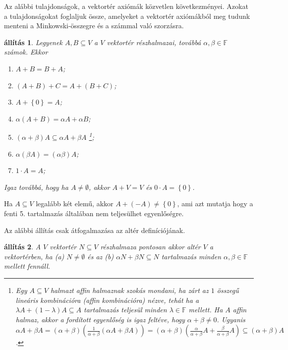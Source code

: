 \documentclass[a4paper, showtrims]{memoir}
\theoremstyle{plain}
\newtheorem{proposition}{állítás}[chapter]
\theoremstyle{remark}
\theoremstyle{definition}
\begin{document}
Az alábbi tulajdonságok, a vektortér axiómák közvetlen következményei.
Azokat a tulajdonságokat foglaljuk össze, amelyeket a vektortér axiómákból meg tudunk menteni
a Minkowski-összegre és a számmal való szorzásra.
\begin{proposition}\label{pr:Minkowski}
	Legyenek $A,B\subseteq V$ a $V$ vektortér részhalmazai,
	továbbá $\alpha,\beta\in\mathbb{F}$ számok.
	Ekkor
	\begin{enumerate}
		\item $A+B=B+A$;
		\item $\left( A+B \right)+C=A+\left( B+C \right)$;
		\item $A+\left\{ 0 \right\}=A$;
		\item $\alpha\left( A+B \right)=\alpha A+\alpha B$;
		\item $\left( \alpha+\beta \right) A\subseteq \alpha A+\beta A$%
		      \footnote{
			      Egy $A\subseteq V$ halmazt \emph{affin halmaznak}
			      szokás mondani,
			      ha zárt az $1$ összegű lineáris kombinációra
			      (\emph{affin kombinációra})
			      nézve,
			      tehát ha a $\lambda A+\left( 1-\lambda \right)A\subseteq A$
			      tartalmazás teljesül minden $\lambda\in\mathbb{F}$
			      mellett.
			      Ha $A$ affin halmaz,
			      akkor a fordított egyenlőség is igaz feltéve, hogy $\alpha+\beta\neq 0$.
			      Ugyanis
			      $\alpha A+\beta A
				      =
				      \left( \alpha+\beta \right)\left( \frac{1}{\alpha+\beta}\left( \alpha A+\beta A \right) \right)
				      =
				      \left( \alpha+\beta \right)\left( \frac{\alpha}{\alpha+\beta}A+\frac{\beta}{\alpha+\beta}A \right)
				      \subseteq
				      \left( \alpha+\beta \right)A$.
		      };
		\item $\alpha\left( \beta A \right)=\left( \alpha\beta \right)A$;
		\item $1\cdot A=A$;
	\end{enumerate}
	Igaz továbbá, hogy ha $A\neq \emptyset$, akkor $A+V=V$ és $0\cdot A=\left\{ 0 \right\}$.
\end{proposition}
Ha $A\subseteq V$ legalább két elemű,
akkor $A+\left( -A \right)\neq\left\{ 0 \right\}$, ami azt mutatja hogy a fenti 5. tartalmazás
általában nem teljesülhet egyenlőségre.

Az alábbi állítás csak átfogalmazása az altér definíciójának.
\begin{proposition}
	A $V$ vektortér $N\subseteq V$ részhalmaza pontosan akkor altér $V$ a vektortérben,
	ha
	(a) $N\neq \emptyset$ és az
	(b) $\alpha N+\beta N\subseteq N$ tartalmazás minden $\alpha,\beta\in\mathbb{F}$
	mellett fennáll.
\end{proposition}
\end{document}
